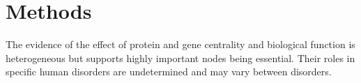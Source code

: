   
  







\section{Methods}
The evidence of the effect of protein and gene centrality and biological function is heterogeneous but supports highly important nodes being essential. Their roles in specific human disorders are undetermined and may vary between disorders. 
  
